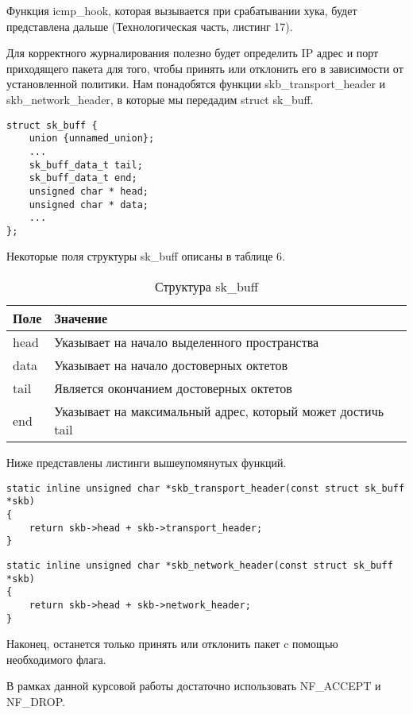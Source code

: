 Функция icmp\_hook, которая вызывается при срабатывании хука, будет представлена дальше (Технологическая часть, листинг 17).

Для корректного журналирования полезно будет определить IP адрес и порт приходящего пакета для того, чтобы принять или отклонить его в зависимости от установленной политики. Нам понадобятся функции skb\_transport\_header и skb\_network\_header, в которые мы передадим struct sk\_buff.

\begin{lstlisting}[caption= struct sk\_buff]
struct sk_buff {
	union {unnamed_union};
	...
	sk_buff_data_t tail;
	sk_buff_data_t end;
	unsigned char * head;
	unsigned char * data;
	...
}; \end{lstlisting}

Некоторые поля структуры sk\_buff описаны в таблице 6.
\newpage
\begin{table}[h!]
	\caption{Структура sk\_buff}
	\begin{tabular}{|p{5cm}|p{11.7cm}|}
		\hline
		Поле & Значение \\
		\hline
		head & Указывает на начало выделенного пространства \\
		\hline
		data & Указывает на начало достоверных октетов \\
		\hline
		tail & Является окончанием достоверных октетов \\
		\hline
		end & Указывает на максимальный адрес, который может достичь tail \\
		\hline
	\end{tabular}
\end{table}

Ниже представлены листинги вышеупомянутых функций.
\begin{lstlisting}[caption= func skb\_transport\_header]
static inline unsigned char *skb_transport_header(const struct sk_buff *skb)
{
	return skb->head + skb->transport_header;
}\end{lstlisting}
\begin{lstlisting}[caption= func skb\_network\_header]
static inline unsigned char *skb_network_header(const struct sk_buff *skb)
{
	return skb->head + skb->network_header;
}
\end{lstlisting}

Наконец, останется только принять или отклонить пакет c помощью необходимого флага.

В рамках данной курсовой работы достаточно использовать NF\_ACCEPT и NF\_DROP.

